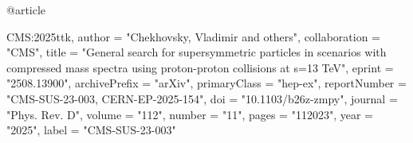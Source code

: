@article{CMS:2025ttk,
    author = "Chekhovsky, Vladimir and others",
    collaboration = "CMS",
    title = "{General search for supersymmetric particles in scenarios with compressed mass spectra using proton-proton collisions at s=13{\,}{\,}TeV}",
    eprint = "2508.13900",
    archivePrefix = "arXiv",
    primaryClass = "hep-ex",
    reportNumber = "CMS-SUS-23-003, CERN-EP-2025-154",
    doi = "10.1103/b26z-zmpy",
    journal = "Phys. Rev. D",
    volume = "112",
    number = "11",
    pages = "112023",
    year = "2025",
    label = "CMS-SUS-23-003"

}

